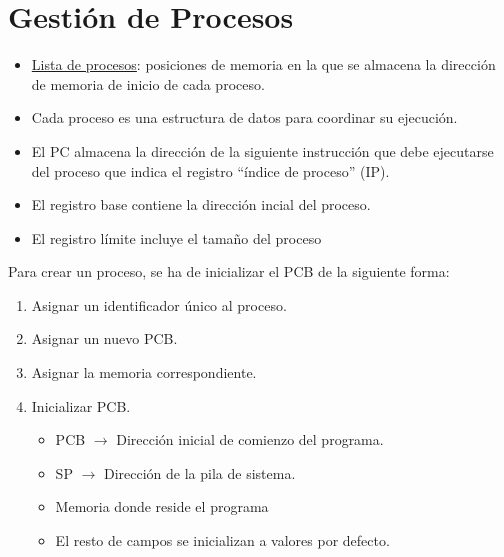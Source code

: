 \section{Gestión de Procesos}
\begin{itemize}
    \item \underline{Lista de procesos}: posiciones de memoria en la que se almacena la dirección de memoria de inicio de cada proceso.

    \item Cada proceso es una estructura de datos para coordinar su ejecución.

    \item El PC almacena la dirección de la siguiente instrucción que debe ejecutarse del proceso que indica el registro ``índice de proceso'' (IP).

    \item El registro base contiene la dirección incial del proceso.

    \item El registro límite incluye el tamaño del proceso
\end{itemize}

Para crear un proceso, se ha de inicializar el PCB de la siguiente forma:
\begin{enumerate}
    \item Asignar un identificador único al proceso.
    \item Asignar un nuevo PCB.
    \item Asignar la memoria correspondiente.
    \item Inicializar PCB.
    \begin{itemize}
        \item PCB $\longrightarrow $ Dirección inicial de comienzo del programa.
        \item SP $\longrightarrow $ Dirección de la pila de sistema.
        \item Memoria donde reside el programa
        \item El resto de campos se inicializan a valores por defecto.
    \end{itemize}
\end{enumerate}


